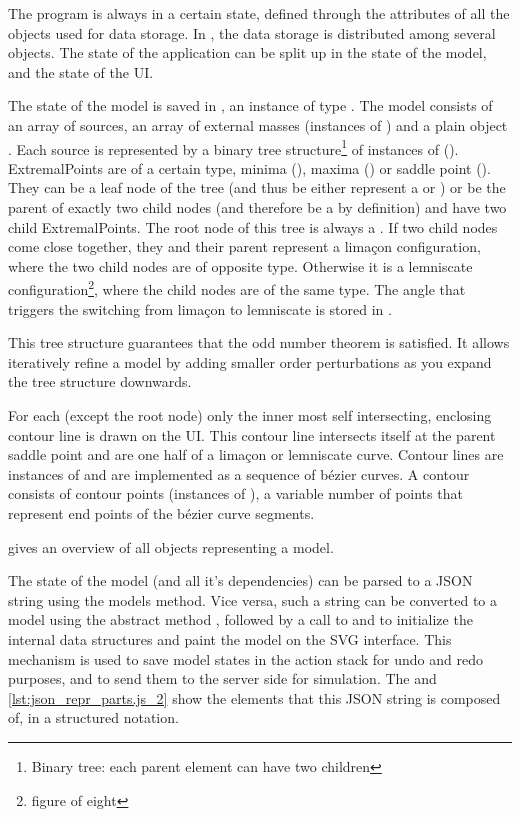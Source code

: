 The program is always in a certain state, defined through the attributes of all the objects used for data storage.
In \spl, the data storage is distributed among several objects.
The state of the application can be split up in the state of the model, and the state of the UI.

The state of the model is saved in , an instance of type .
The model  consists of an array of sources, an array of external masses (instances of ) and a plain object .
Each source is represented by a binary tree structure\footnote{Binary tree: each parent element can have two children} of instances of  ().
ExtremalPoints are of a certain type, minima (), maxima () or saddle point ().
They can be a leaf node of the tree (and thus be either represent a  or ) or be the parent of exactly two child nodes (and therefore be a  by definition) and have two child ExtremalPoints.
The root node of this tree is always a .
If two child nodes come close together, they and their parent represent a limaçon configuration, where the two child nodes are of opposite type.
Otherwise it is a lemniscate configuration\footnote{figure of eight}, where the child nodes are of the same type.
The angle that triggers the switching from limaçon to lemniscate is stored in .

This tree structure guarantees that the odd number theorem is satisfied.
It allows iteratively refine a model by adding smaller order perturbations as you expand the tree structure downwards.


For each  (except the root node) only the inner most self intersecting, enclosing contour line is drawn on the UI.
This contour line intersects itself at the parent saddle point and are one half of a limaçon or lemniscate curve.
Contour lines are instances of  and are implemented as a sequence of bézier curves.
A contour consists of contour points (instances of ), a variable number of points that represent end points of the bézier curve segments.

 gives an overview of all objects representing a model.

The state of the model (and all it's dependencies) can be parsed to a JSON string using the models  method.
Vice versa, such a string can be converted to a model using the abstract method , followed by a call to  and  to initialize the internal data structures and paint the model on the SVG interface.
This mechanism is used to save model states in the action stack for undo and redo purposes, and to send them to the server side for simulation.
The  and \ref{lst:json_repr_parts.js_2} show the elements that this JSON string is composed of, in a structured notation.

